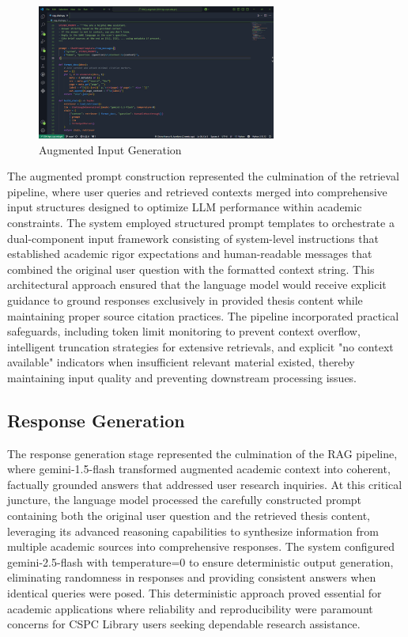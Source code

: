 \begin{refsection}
\begin{figure}[h]
    \centering
    \includegraphics[width=0.7\textwidth]{figures/augInGen.png}
    \caption{Augmented Input Generation}
\end{figure}

The augmented prompt construction represented the culmination of the retrieval pipeline, where user queries and retrieved contexts merged into comprehensive input structures designed to optimize LLM performance within academic constraints. The system employed structured prompt templates to orchestrate a dual-component input framework consisting of system-level instructions that established academic rigor expectations and human-readable messages that combined the original user question with the formatted context string. This architectural approach ensured that the language model would receive explicit guidance to ground responses exclusively in provided thesis content while maintaining proper source citation practices. The pipeline incorporated practical safeguards, including token limit monitoring to prevent context overflow, intelligent truncation strategies for extensive retrievals, and explicit "no context available" indicators when insufficient relevant material existed, thereby maintaining input quality and preventing downstream processing issues.

\subsection{Response Generation}

The response generation stage represented the culmination of the RAG pipeline, where gemini-1.5-flash transformed augmented academic context into coherent, factually grounded answers that addressed user research inquiries. At this critical juncture, the language model processed the carefully constructed prompt containing both the original user question and the retrieved thesis content, leveraging its advanced reasoning capabilities to synthesize information from multiple academic sources into comprehensive responses. The system configured gemini-2.5-flash with temperature=0 to ensure deterministic output generation, eliminating randomness in responses and providing consistent answers when identical queries were posed. This deterministic approach proved essential for academic applications where reliability and reproducibility were paramount concerns for CSPC Library users seeking dependable research assistance.


\end{refsection}
